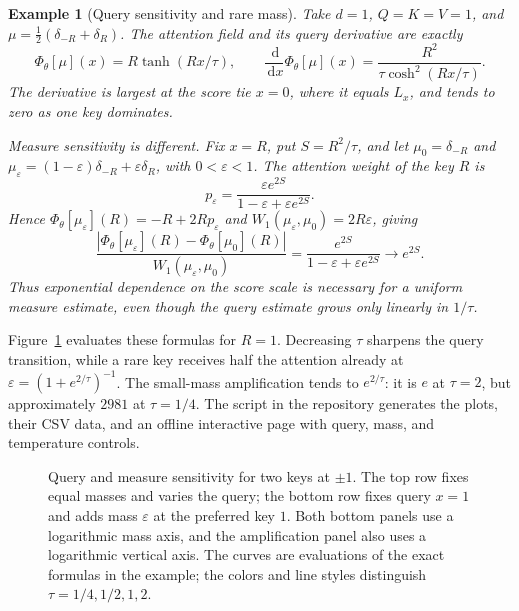 \documentclass[11pt]{amsart}
\numberwithin{equation}{section}
\theoremstyle{plain}
\newtheorem{example}[theorem]{Example}
\newcommand{\dd}{\,\mathrm{d}}
\newcommand{\abs}[1]{\left\lvert#1\right\rvert}
\begin{document}
\begin{example}[Query sensitivity and rare mass]
Take $d=1$, $Q=K=V=1$, and $\mu=\frac12(\delta_{-R}+\delta_R)$.
The attention field and its query derivative are exactly
\[
 \Phi_\theta[\mu](x)=R\tanh(Rx/\tau),\qquad
 \frac{\dd}{\dd x}\Phi_\theta[\mu](x)
 =\frac{R^2}{\tau\cosh^2(Rx/\tau)}.
\]
The derivative is largest at the score tie $x=0$, where it equals $L_x$,
and tends to zero as one key dominates.

Measure sensitivity is different.  Fix $x=R$, put $S=R^2/\tau$, and let
$\mu_0=\delta_{-R}$ and
$\mu_\varepsilon=(1-\varepsilon)\delta_{-R}+\varepsilon\delta_R$, with
$0<\varepsilon<1$.  The attention weight of the key $R$ is
\[
 p_\varepsilon
 =\frac{\varepsilon e^{2S}}{1-\varepsilon+\varepsilon e^{2S}}.
\]
Hence $\Phi_\theta[\mu_\varepsilon](R)=-R+2Rp_\varepsilon$ and
$W_1(\mu_\varepsilon,\mu_0)=2R\varepsilon$, giving
\[
 \frac{\abs{\Phi_\theta[\mu_\varepsilon](R)
                 -\Phi_\theta[\mu_0](R)}}{W_1(\mu_\varepsilon,\mu_0)}
 =\frac{e^{2S}}{1-\varepsilon+\varepsilon e^{2S}}
 \longrightarrow e^{2S}.
\]
Thus exponential dependence on the score scale is necessary for a uniform
measure estimate, even though the query estimate grows only linearly in
$1/\tau$. 
\end{example}

Figure~\ref{fig:attention-sensitivity} evaluates these formulas for $R=1$.  Decreasing $\tau$ sharpens the query transition, while a rare key receives half the attention already at $\varepsilon=(1+e^{2/\tau})^{-1}$.  The small-mass amplification tends to $e^{2/\tau}$: it is $e$ at $\tau=2$, but approximately $2981$ at $\tau=1/4$. The script in the repository generates the plots, their CSV data, and an offline interactive page with query, mass, and temperature controls. 

\begin{figure}[htbp]
\centering

\caption{Query and measure sensitivity for two keys at $\pm1$. The top row fixes equal masses and varies the query; the bottom row fixes query $x=1$ and adds mass $\varepsilon$ at the preferred key $1$. 
Both bottom panels use a logarithmic mass axis, and the amplification panel also uses a logarithmic vertical axis.  The curves are evaluations of the exact formulas in the example; the colors and line styles distinguish
$\tau=1/4,1/2,1,2$.}
\label{fig:attention-sensitivity}
\end{figure}
\end{document}
